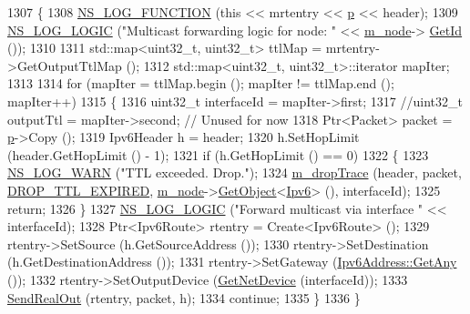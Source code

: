 \begin{DoxyCode}
1307 \{
1308   \hyperlink{log-macros-disabled_8h_a90b90d5bad1f39cb1b64923ea94c0761}{NS\_LOG\_FUNCTION} (\textcolor{keyword}{this} << mrtentry << \hyperlink{lte__link__budget_8m_ac9de518908a968428863f829398a4e62}{p} << header);
1309   \hyperlink{group__logging_ga88acd260151caf2db9c0fc84997f45ce}{NS\_LOG\_LOGIC} (\textcolor{stringliteral}{"Multicast forwarding logic for node: "} << \hyperlink{classns3_1_1Ipv6L3Protocol_a543d8509395ee76de15d039ff1fce642}{m\_node}->
      \hyperlink{classns3_1_1Node_aaf49b64a843565ce3812326313b370ac}{GetId} ());
1310 
1311   std::map<uint32\_t, uint32\_t> ttlMap = mrtentry->GetOutputTtlMap ();
1312   std::map<uint32\_t, uint32\_t>::iterator mapIter;
1313 
1314   \textcolor{keywordflow}{for} (mapIter = ttlMap.begin (); mapIter != ttlMap.end (); mapIter++)
1315     \{
1316       uint32\_t interfaceId = mapIter->first;
1317       \textcolor{comment}{//uint32\_t outputTtl = mapIter->second;  // Unused for now}
1318       Ptr<Packet> packet = \hyperlink{lte__link__budget_8m_ac9de518908a968428863f829398a4e62}{p}->Copy ();
1319       Ipv6Header h = header;
1320       h.SetHopLimit (header.GetHopLimit () - 1);
1321       \textcolor{keywordflow}{if} (h.GetHopLimit () == 0)
1322         \{
1323           \hyperlink{group__logging_gade7208b4009cdf0e25783cd26766f559}{NS\_LOG\_WARN} (\textcolor{stringliteral}{"TTL exceeded.  Drop."});
1324           \hyperlink{classns3_1_1Ipv6L3Protocol_ac22d2d63cac436267ae6cafc46880a6e}{m\_dropTrace} (header, packet, \hyperlink{classns3_1_1Ipv6L3Protocol_a33c64db9bc35f71ff368b132bfffa37aa49c4e7173190b1bbba7d6300b06a16ed}{DROP\_TTL\_EXPIRED}, 
      \hyperlink{classns3_1_1Ipv6L3Protocol_a543d8509395ee76de15d039ff1fce642}{m\_node}->\hyperlink{classns3_1_1Object_a13e18c00017096c8381eb651d5bd0783}{GetObject}<\hyperlink{classns3_1_1Ipv6_adccc58acd14d3f9a28f75dc09e794998}{Ipv6}> (), interfaceId);
1325           \textcolor{keywordflow}{return};
1326         \}
1327       \hyperlink{group__logging_ga88acd260151caf2db9c0fc84997f45ce}{NS\_LOG\_LOGIC} (\textcolor{stringliteral}{"Forward multicast via interface "} << interfaceId);
1328       Ptr<Ipv6Route> rtentry = Create<Ipv6Route> ();
1329       rtentry->SetSource (h.GetSourceAddress ());
1330       rtentry->SetDestination (h.GetDestinationAddress ());
1331       rtentry->SetGateway (\hyperlink{classns3_1_1Ipv6Address_a2783e8badfc98c8b0a8508bba6e1b91e}{Ipv6Address::GetAny} ());
1332       rtentry->SetOutputDevice (\hyperlink{classns3_1_1Ipv6L3Protocol_a574d1beafc86062acf582e75dc437a47}{GetNetDevice} (interfaceId));
1333       \hyperlink{classns3_1_1Ipv6L3Protocol_adad363af4c50cd94505b918b15f228d4}{SendRealOut} (rtentry, packet, h);
1334       \textcolor{keywordflow}{continue};
1335     \}
1336 \}
\end{DoxyCode}


